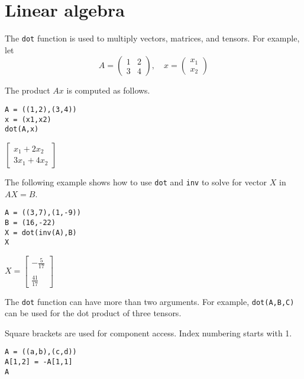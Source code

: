 

\section*{Linear algebra}

The \verb$dot$ function is used to multiply vectors, matrices, and tensors.
For example, let
\begin{equation*}
A=\begin{pmatrix}1&2\\3&4\end{pmatrix},
\quad
x=\begin{pmatrix}x_1\\x_2\end{pmatrix}
\end{equation*}

The product $Ax$ is computed as follows.

{\color{blue}
\begin{verbatim}
A = ((1,2),(3,4))
x = (x1,x2)
dot(A,x)
\end{verbatim}
}

$\displaystyle
\begin{bmatrix}
x_1+2x_2
\\[1ex]
3x_1+4x_2
\end{bmatrix}
$

\bigskip

The following example shows how to use \verb$dot$ and \verb$inv$ to solve for
vector $X$ in $AX=B$.

{\color{blue}
\begin{verbatim}
A = ((3,7),(1,-9))
B = (16,-22)
X = dot(inv(A),B)
X
\end{verbatim}
}

$\displaystyle
X=
\begin{bmatrix}
-\tfrac{5}{17}
\\
\\
\tfrac{41}{17}
\end{bmatrix}
$

\bigskip

The \verb$dot$ function can have more than two arguments.
For example, \verb$dot(A,B,C)$ can be used for the dot product of three tensors.

\bigskip

Square brackets are used for component access.
Index numbering starts with 1.

{\color{blue}
\begin{verbatim}
A = ((a,b),(c,d))
A[1,2] = -A[1,1]
A
\end{verbatim}
}

